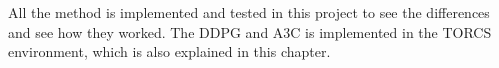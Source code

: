 All the method is implemented and tested in this project to see the differences and see how they worked. The DDPG and A3C is implemented in the TORCS environment, which is also explained in this chapter. 








